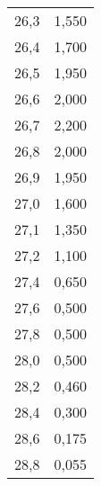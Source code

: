 \begin{table}[H]
\begin{tabular}[t]{ c c }
    26,3 & 1,550 \\
    26,4 & 1,700 \\
    26,5 & 1,950 \\
    26,6 & 2,000 \\
    26,7 & 2,200 \\
    26,8 & 2,000 \\
    26,9 & 1,950 \\
    27,0 & 1,600 \\
    27,1 & 1,350 \\
    27,2 & 1,100 \\
    27,4 & 0,650 \\
    27,6 & 0,500 \\
    27,8 & 0,500 \\
    28,0 & 0,500 \\
    28,2 & 0,460 \\
    28,4 & 0,300 \\
    28,6 & 0,175 \\
    28,8 & 0,055 \\
    \bottomrule
  \end{tabular}
\end{table}
